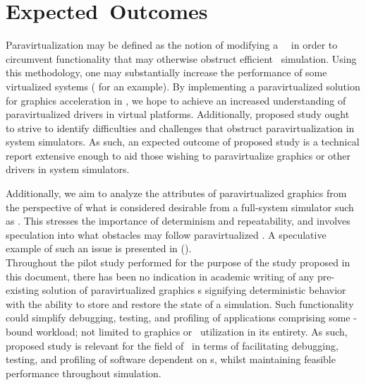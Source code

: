 \chapter{Expected~Outcomes}
\label{cha:expectedoutcomes}
Paravirtualization may be defined as the notion of modifying a \termtarget\ \termos\ in order to circumvent functionality that may otherwise obstruct efficient \termisa\ simulation.
Using this methodology, one may substantially increase the performance of some virtualized systems ( for an example).
By implementing a paravirtualized solution for graphics acceleration in \termsimics , we hope to achieve an increased understanding of paravirtualized drivers in virtual platforms. Additionally, proposed study ought to strive to identify difficulties and challenges that obstruct paravirtualization in system simulators. As such, an expected outcome of proposed study is a technical report extensive enough to aid those wishing to paravirtualize graphics or other drivers in system simulators.

Additionally, we aim to analyze the attributes of paravirtualized graphics from the perspective of what is considered desirable from a full-system simulator such as \termsimics .
This stresses the importance of determinism and repeatability, and involves speculation into what obstacles may follow paravirtualized \termopengles .
A speculative example of such an issue is presented in  ().\\

\noindent
Throughout the pilot study performed for the purpose of the study proposed in this document, there has been no indication in academic writing of any pre-existing solution of paravirtualized graphics \termapi s signifying deterministic behavior with the ability to store and restore the state of a simulation.
Such functionality could simplify debugging, testing, and profiling of applications comprising some \termgpu -bound workload; not limited to graphics or \termgpu\ utilization in its entirety.
As such, proposed study is relevant for the field of \termcompsci\ in terms of facilitating debugging, testing, and profiling of software dependent on \termgpu s, whilst maintaining feasible performance throughout simulation.

